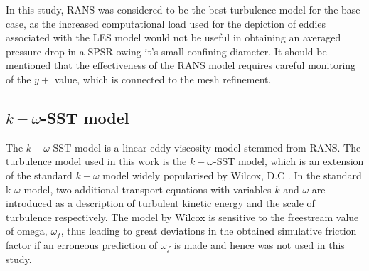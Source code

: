 In this study, RANS was considered to be the best turbulence model for the base case, as the increased computational load used for the depiction of eddies associated with the LES model would not be useful in obtaining an averaged pressure drop in a SPSR owing it's small confining diameter. It should be mentioned that the effectiveness of the RANS model requires careful monitoring of the $y+$ value, which is connected to the mesh refinement.
%
%
\subsection{$k-\omega$-SST model}
The $k-\omega$-SST model is a linear eddy viscosity model stemmed from RANS. The turbulence model used in this work is the $k-\omega$-SST model, which is an extension of the standard $k-\omega$ model widely popularised by Wilcox, D.C \cite{Wilcox1993a}. In the standard k-$\omega$ model, two additional transport equations with variables $k$ and $\omega$ are introduced as a description of turbulent kinetic energy and the scale of turbulence respectively. The model by Wilcox is sensitive to the freestream value of omega, $\omega_f$, thus leading to great deviations in the obtained simulative friction factor if an erroneous prediction of $\omega_f$ is made and hence was not used in this study.
